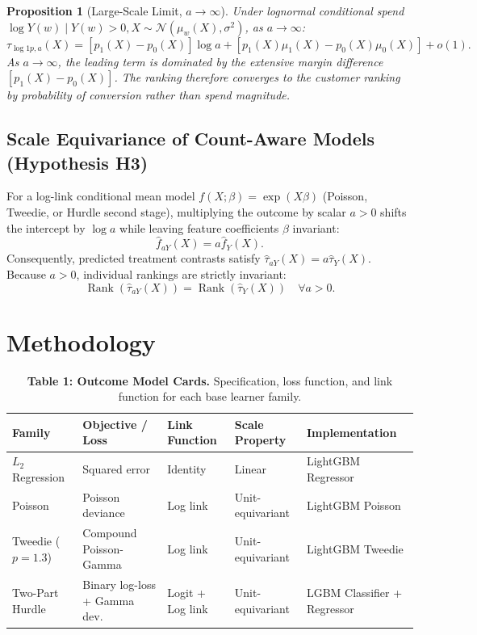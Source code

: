 \documentclass[conference]{IEEEtran}
\newtheorem{proposition}{Proposition}
\begin{document}
\begin{proposition}[Large-Scale Limit, $a \to \infty$]
Under lognormal conditional spend $\log Y(w) \mid Y(w)>0, X \sim \mathcal{N}(\mu_w(X), \sigma^2)$, as $a \to \infty$:
\begin{equation}
\tau_{\log 1p, a}(X) = [p_1(X) - p_0(X)] \log a + [p_1(X)\mu_1(X) - p_0(X)\mu_0(X)] + o(1).
\end{equation}
As $a \to \infty$, the leading term is dominated by the extensive margin difference $[p_1(X) - p_0(X)]$. The ranking therefore converges to the customer ranking by probability of conversion rather than spend magnitude.
\end{proposition}

\subsection{Scale Equivariance of Count-Aware Models (Hypothesis H3)}
For a log-link conditional mean model $f(X; \beta) = \exp(X\beta)$ (Poisson, Tweedie, or Hurdle second stage), multiplying the outcome by scalar $a > 0$ shifts the intercept by $\log a$ while leaving feature coefficients $\beta$ invariant:
\begin{equation}
\hat{f}_{aY}(X) = a \hat{f}_Y(X).
\end{equation}
Consequently, predicted treatment contrasts satisfy $\hat{\tau}_{aY}(X) = a \hat{\tau}_Y(X)$. Because $a > 0$, individual rankings are strictly invariant:
\begin{equation}
\operatorname{Rank}(\hat{\tau}_{aY}(X)) = \operatorname{Rank}(\hat{\tau}_Y(X)) \quad \forall a > 0.
\end{equation}

\section{Methodology}
\label{sec:methods}

\begin{table}[htbp]
\centering
\caption{\textbf{Table 1: Outcome Model Cards.} Specification, loss function, and link function for each base learner family.}
\label{tab:model_cards}
\begin{tabular}{lllll}
\toprule
Family & Objective / Loss & Link Function & Scale Property & Implementation \\
\midrule
$L_2$ Regression & Squared error & Identity & Linear & LightGBM Regressor \\
Poisson & Poisson deviance & Log link & Unit-equivariant & LightGBM Poisson \\
Tweedie ($p=1.3$) & Compound Poisson-Gamma & Log link & Unit-equivariant & LightGBM Tweedie \\
Two-Part Hurdle & Binary log-loss + Gamma dev. & Logit + Log link & Unit-equivariant & LGBM Classifier + Regressor \\
\bottomrule
\end{tabular}
\end{table}
\end{document}
